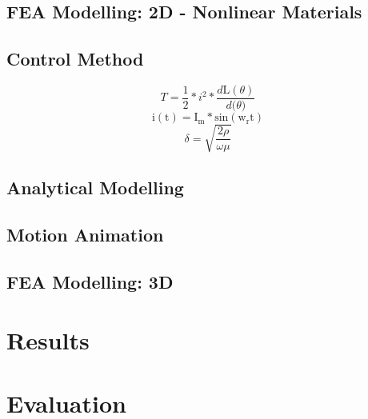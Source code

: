 \documentclass[a4paper, 11pt]{article}
\begin{document}
\subsection{FEA Modelling: 2D - Nonlinear Materials}
\subsection{Control Method}

\begin{equation}
\label{skineffect}
	T=\frac{1}{2}*i^2*\frac{d\mathrm L(\theta)}{d\mathrm (\theta)}
    \label{biotsavart}
\end{equation}
\begin{equation}
\label{skineffect}
	\mathrm{i(t)}=\mathrm{I_m}*\mathrm{sin(w_rt)}
\end{equation}
\begin{equation}
    \delta=\sqrt{\frac{2\rho}{\omega\mu}}
\end{equation}

\subsection{Analytical Modelling}
\subsection{Motion Animation}
\subsection{FEA Modelling: 3D}
\section{Results}
\section{Evaluation}
\end{document}
